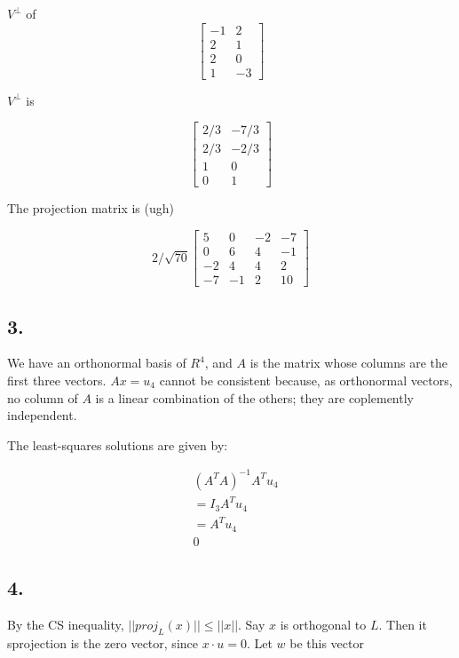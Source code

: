 \documentclass[
]{article}
\begin{document}
\(V^{\perp}\) of \[\begin{bmatrix}-1 & 2\\
2 & 1\\
2 & 0\\
1 & -3\end{bmatrix}\]

\(V^{\perp}\) is

\[
  \begin{bmatrix}
  2/3 & -7/3\\
  2/3 & -2/3\\
  1 & 0\\
  0 & 1
  \end{bmatrix}
\]

The projection matrix is (ugh)

\[ 2/\sqrt{70}
  \begin{bmatrix}
    5 & 0 & -2 & -7\\
    0 & 6 & 4 & -1\\
    -2 & 4 & 4 &2\\
    -7 &-1 & 2 & 10
  \end{bmatrix}
\]

\hypertarget{section-2}{%
\subsection{3.}\label{section-2}}

We have an orthonormal basis of \(R^4\), and \(A\) is the matrix whose
columns are the first three vectors. \(Ax=u_4\) cannot be consistent
because, as orthonormal vectors, no column of \(A\) is a linear
combination of the others; they are coplemently independent.

The least-squares solutions are given by:

\[
  \begin{aligned}
    & (A^TA)^{-1}A^Tu_4\\
    & = I_3A^Tu_4\\
    & = A^Tu_4\\
    &0
  \end{aligned}
\]

\hypertarget{section-3}{%
\subsection{4.}\label{section-3}}

By the CS inequality, \(||proj_L(x)|| \leq ||x||\). Say \(x\) is
orthogonal to \(L\). Then it sprojection is the zero vector, since
\(x \cdot u = 0\). Let \(w\) be this vector
\end{document}
